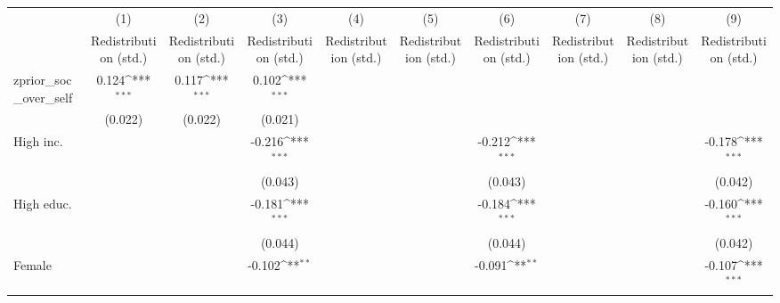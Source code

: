 {
\def\sym#1{\ifmmode^{#1}\else\(^{#1}\)\fi}
\begin{tabular}{l*{9}{c}}
\toprule
                    &\multicolumn{1}{c}{(1)}&\multicolumn{1}{c}{(2)}&\multicolumn{1}{c}{(3)}&\multicolumn{1}{c}{(4)}&\multicolumn{1}{c}{(5)}&\multicolumn{1}{c}{(6)}&\multicolumn{1}{c}{(7)}&\multicolumn{1}{c}{(8)}&\multicolumn{1}{c}{(9)}\\
                    &\multicolumn{1}{c}{Redistribution (std.)}&\multicolumn{1}{c}{Redistribution (std.)}&\multicolumn{1}{c}{Redistribution (std.)}&\multicolumn{1}{c}{Redistribution (std.)}&\multicolumn{1}{c}{Redistribution (std.)}&\multicolumn{1}{c}{Redistribution (std.)}&\multicolumn{1}{c}{Redistribution (std.)}&\multicolumn{1}{c}{Redistribution (std.)}&\multicolumn{1}{c}{Redistribution (std.)}\\
\midrule
zprior\_soc\_over\_self&       0.124\sym{***}&       0.117\sym{***}&       0.102\sym{***}&                     &                     &                     &                     &                     &                     \\
                    &     (0.022)         &     (0.022)         &     (0.021)         &                     &                     &                     &                     &                     &                     \\
\addlinespace
High inc.           &                     &                     &      -0.216\sym{***}&                     &                     &      -0.212\sym{***}&                     &                     &      -0.178\sym{***}\\
                    &                     &                     &     (0.043)         &                     &                     &     (0.043)         &                     &                     &     (0.042)         \\
\addlinespace
High educ.          &                     &                     &      -0.181\sym{***}&                     &                     &      -0.184\sym{***}&                     &                     &      -0.160\sym{***}\\
                    &                     &                     &     (0.044)         &                     &                     &     (0.044)         &                     &                     &     (0.042)         \\
\addlinespace
Female              &                     &                     &      -0.102\sym{**} &                     &                     &      -0.091\sym{**} &                     &                     &      -0.107\sym{***}\\

\end{tabular}}
